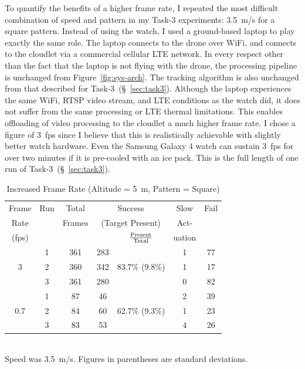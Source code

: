 To quantify the benefits of a higher frame rate, I repeated the most
difficult combination of speed and pattern in my Task-3 experiments:
3.5~m/s for a square pattern. Instead of using the watch, I used a
ground-based laptop to play exactly the same role.  The laptop
connects to the drone over WiFi, and connects to the cloudlet via a
commercial cellular LTE network.  In every respect other than the fact
that the laptop is not flying with the drone, the processing
pipeline is unchanged from  Figure~\ref{fig:sys-arch}.
The tracking algorithm is also unchanged from that described for
Task-3~(\S~\ref{sec:task3}). Although the laptop experiences the same
WiFi, RTSP video stream, and LTE conditions as the watch did, it does
not suffer from the same processing or LTE thermal limitations.  This
enables offloading of video processing to the cloudlet a much higher frame
rate. I chose a figure of 3~fps since I believe that this is
realistically achievable with slightly better watch hardware. Even the
Samsung Galaxy 4 watch can sustain 3~fps for over two minutes if it is
pre-cooled with an ice pack.  This is the full length of one run of
Task-3~(\S~\ref{sec:task3}).

\begin{table}
        \centering\small
        \begin{tabular}{|c|c|c|c|c|c|c|}
                \hline
                Frame & Run & Total & \multicolumn{2}{c|}{Success} & Slow & Fail\\
                Rate  &  & Frames  & \multicolumn{2}{c|}{{\footnotesize (Target Present)}}& Act-  &  \\
                \cline{5-5}
                (fps) &  &         &         & $\rm \frac{Present}{Total}$  & uation  & \\
                \hline
                & 1 & 361 & 283 &        & 1 &  77 \\
                3& 2 & 360 & 342 & 83.7\% \scriptsize{(9.8\%)} & 1 & 17 \\
                & 3 & 361 & 280 &        & 0 &  82 \\
                \hline
                    & 1 & 87 & 46 & & 2 & 39 \\
                0.7 & 2 & 84 & 60 & 62.7\% \scriptsize{(9.3\%)} & 1 & 23  \\
                & 3 & 83 & 53 & & 4 & 26 \\
                \hline
        \end{tabular}
        \begin{captext}
                \centering \\[0.1cm] Speed was 3.5~m/s.  Figures in parentheses are standard deviations.
        \end{captext}
        \caption{Increased Frame Rate {\footnotesize (Altitude = 5~m, Pattern = Square)}}
        \label{tab:taskfps-results}
\end{table}

